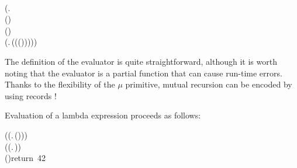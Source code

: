 \begin{hscode}
\\
\>[9]{}(\lambda {}\mathbin{:}.\,\;\;\<[E]%
\\
\>[9]{}\<[11]%
\>[11]{}\;(\mathbin{:})\Rightarrow {}\;\<[E]%
\\
\>[9]{}\mid {}\;(\mathbin{:}\to {})\Rightarrow {}\<[E]%
\\
\>[9]{}\<[13]%
\>[13]{}\;(\lambda {}\mathbin{:}.\,(\;\;(\;(\;\;))))){}\<[E]%
\\
\>[3]{}\;\;\mathbin{:}\to {}\mathrel{=}\;\<[E]%
\ColumnHook
\end{hscode}\resethooks
The definition of the evaluator is quite straightforward, although it
is worth noting that the evaluator is a partial function that can
cause run-time errors. Thanks to the flexibility of the $\mu$
primitive, mutual recursion can be encoded by using records
!

Evaluation of a lambda expression proceeds as follows:
\begin{hscode}\SaveRestoreHook
{}%
%
%
%
\>[3]{}\;\mathbin{:}\mathrel{=}\;{}\<[25]%
\>[25]{}(\;(\lambda {}\mathbin{:}.\,\;\;(\;)))\;{}\<[E]%
\\
\>[25]{}(\;(\lambda {}\mathbin{:}.\,)){}\<[E]%
\\
\>[3]{}\;\;(\;)\mbox{\onelinecomment  return 42}{}\<[E]%
\ColumnHook
\end{hscode}\resethooks

